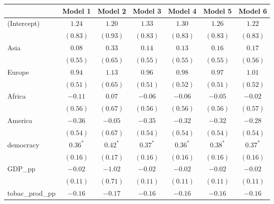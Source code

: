 
\begin{table}[!h]
\begin{center}
\begin{tabular}{l c c c c c c }
\toprule
 & Model 1 & Model 2 & Model 3 & Model 4 & Model 5 & Model 6 \\
\midrule
(Intercept)             & $1.24$       & $1.20$       & $1.33$       & $1.30$       & $1.26$       & $1.22$       \\
                        & $(0.83)$     & $(0.93)$     & $(0.83)$     & $(0.83)$     & $(0.83)$     & $(0.83)$     \\
Asia                    & $0.08$       & $0.33$       & $0.14$       & $0.13$       & $0.16$       & $0.17$       \\
                        & $(0.55)$     & $(0.65)$     & $(0.55)$     & $(0.55)$     & $(0.55)$     & $(0.56)$     \\
Europe                  & $0.94$       & $1.13$       & $0.96$       & $0.98$       & $0.97$       & $1.01$       \\
                        & $(0.51)$     & $(0.65)$     & $(0.51)$     & $(0.52)$     & $(0.51)$     & $(0.52)$     \\
Africa                  & $-0.11$      & $0.07$       & $-0.06$      & $-0.06$      & $-0.05$      & $-0.02$      \\
                        & $(0.56)$     & $(0.67)$     & $(0.56)$     & $(0.56)$     & $(0.56)$     & $(0.57)$     \\
America                 & $-0.36$      & $-0.05$      & $-0.35$      & $-0.32$      & $-0.32$      & $-0.28$      \\
                        & $(0.54)$     & $(0.67)$     & $(0.54)$     & $(0.54)$     & $(0.54)$     & $(0.54)$     \\
democracy               & $0.36^{*}$   & $0.42^{*}$   & $0.37^{*}$   & $0.36^{*}$   & $0.38^{*}$   & $0.37^{*}$   \\
                        & $(0.16)$     & $(0.17)$     & $(0.16)$     & $(0.16)$     & $(0.16)$     & $(0.16)$     \\
GDP\_pp                 & $-0.02$      & $-1.02$      & $-0.02$      & $-0.02$      & $-0.02$      & $-0.02$      \\
                        & $(0.11)$     & $(0.71)$     & $(0.11)$     & $(0.11)$     & $(0.11)$     & $(0.11)$     \\
tobac\_prod\_pp         & $-0.16$      & $-0.17$      & $-0.16$      & $-0.16$      & $-0.16$      & $-0.16$      \\

\end{tabular}
\end{center}
\end{table}
